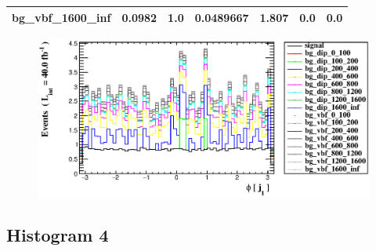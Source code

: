 \documentclass[a4paper, 10pt]{article}
\begin{document}
\begin{table}[H]
\begin{center}
\begin{tabular}{|m{23.0mm}|m{23.0mm}|m{18.0mm}|m{19.0mm}|m{19.0mm}|m{19.0mm}|m{19.0mm}|}
      \hline
      {\cellcolor{white}         bg\_vbf\_1600\_inf}& {\cellcolor{white}         0.0982}& {\cellcolor{white}         1.0}& {\cellcolor{white}         0.0489667}& {\cellcolor{white}         1.807}& {\cellcolor{green}         0.0}& {\cellcolor{green}         0.0}\\
\hline
    \end{tabular}
  \end{center}
\end{table}

\begin{figure}[H]
  \begin{center}
    \includegraphics[scale=0.45]{selection_2.eps}\\
\caption{   }
  \end{center}
\end{figure}
      \newpage
\subsection{ Histogram 4}
\end{document}
